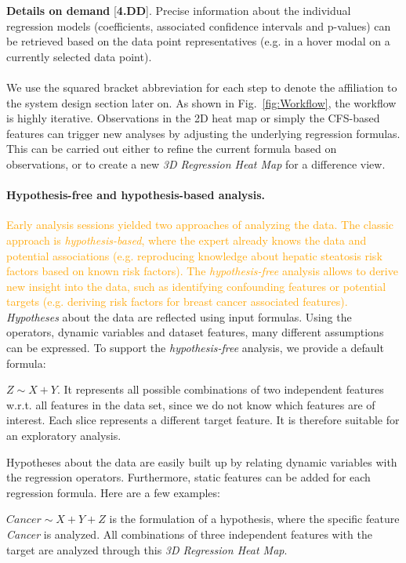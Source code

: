 \documentclass[journal]{style/vgtc} 			          %
\newcommand{\design}[1]{\textcolor{orange}{#1}}
\begin{document}
\textbf{Details on demand} [\textbf{4.DD}]. Precise information about the individual regression models (coefficients, associated confidence intervals and p-values) can be retrieved based on the data point representatives (e.g. in a hover modal on a currently selected data point).
\\\\
We use the squared bracket abbreviation for each step to denote the affiliation to the system design section later on.
As shown in Fig.~\ref{fig:Workflow}, the workflow is highly iterative.
Observations in the 2D heat map or simply the CFS-based features can trigger new analyses by adjusting the underlying regression formulas.
This can be carried out either to refine the current formula based on observations, or to create a new \emph{3D Regression Heat Map} for a difference view.
\paragraph{Hypothesis-free and hypothesis-based analysis.}
\design{
Early analysis sessions yielded two approaches of analyzing the data.
The classic approach is \emph{hypothesis-based}, where the expert already knows the data and potential associations (e.g. reproducing knowledge about hepatic steatosis risk factors based on known risk factors).
The \emph{hypothesis-free} analysis allows to derive new insight into the data, such as identifying confounding features or potential targets (e.g. deriving risk factors for breast cancer associated features).
}
\emph{Hypotheses} about the data are reflected using input formulas.
Using the operators, dynamic variables and dataset features, many different assumptions can be expressed.
To support the \emph{hypothesis-free} analysis, we provide a default formula:

$Z \sim X + Y$.
It represents all possible combinations of two independent features w.r.t. all features in the data set, since we do not know which features are of interest.
Each slice represents a different target feature.
It is therefore suitable for an exploratory analysis.

Hypotheses about the data are easily built up by relating dynamic variables with the regression operators.
Furthermore, static features can be added for each regression formula.
Here are a few examples:

$Cancer \sim X + Y + Z$ is the formulation of a hypothesis, where the specific feature \textit{Cancer} is analyzed.
All combinations of three independent features with the target are analyzed through this \emph{3D Regression Heat Map}.
\end{document}
